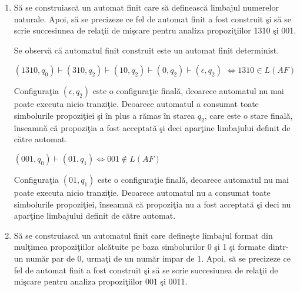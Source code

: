\begin{enumerate}
\item
Să se construiască un automat finit care să definească limbajul numerelor naturale. Apoi, să se precizeze ce fel de automat finit a fost construit şi să se scrie succesiunea de relaţii de mişcare pentru analiza propoziţiilor 1310 şi 001.

\begin{figure}[H]
\centering
{}
\end{figure}

Se observă că automatul finit construit este un automat finit determinist.

$  (1310,q_0)  \vdash (310,q_2) \vdash  (10,q_2) \vdash (0,q_2) \vdash  (\epsilon,q_2)$ $ \Leftrightarrow 1310 \in L(AF)$

Configuraţia $ (\epsilon,q_2) $ este o configuraţie finală, deoarece automatul nu mai poate executa nicio tranziţie. Deoarece automatul a consumat toate simbolurile propoziţiei şi în plus a rămas în starea $ q_2 $, care este o stare finală, înseamnă că propoziţia a fost acceptată şi deci aparţine limbajului definit de către automat.

$  (001,q_0)  \vdash (01,q_1)  \Leftrightarrow 001 \notin L(AF)$

Configuraţia $ (01,q_1) $ este o configuraţie finală, deoarece automatul nu mai poate executa nicio tranziţie. Deoarece automatul nu a consumat toate simbolurile propoziţiei, înseamnă că propoziţia nu a fost acceptată şi deci nu aparţine limbajului definit de către automat.

\item
Să se construiască un automatul finit care defineşte limbajul format din mulţimea propoziţiilor alcătuite pe baza simbolurilor 0 şi 1 şi formate dintr-un număr par de 0, urmaţi de un număr impar de 1. Apoi, să se precizeze ce fel de automat finit a fost construit şi să se scrie succesiunea de relaţii de mişcare pentru analiza propoziţiilor 001 şi 0011.


\end{enumerate}
